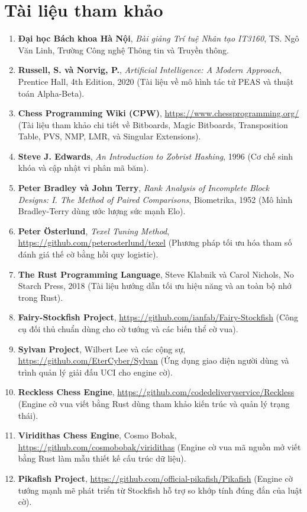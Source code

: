 \chapter*{Tài liệu tham khảo}

\begin{enumerate}
    \item \textbf{Đại học Bách khoa Hà Nội}, \textit{Bài giảng Trí tuệ Nhân tạo IT3160}, TS. Ngô Văn Linh, Trường Công nghệ Thông tin và Truyền thông.
    \item \textbf{Russell, S. và Norvig, P.}, \textit{Artificial Intelligence: A Modern Approach}, Prentice Hall, 4th Edition, 2020 (Tài liệu về mô hình tác tử PEAS và thuật toán Alpha-Beta).
    \item \textbf{Chess Programming Wiki (CPW)}, \url{https://www.chessprogramming.org/} (Tài liệu tham khảo chi tiết về Bitboards, Magic Bitboards, Transposition Table, PVS, NMP, LMR, và Singular Extensions).
    \item \textbf{Steve J. Edwards}, \textit{An Introduction to Zobrist Hashing}, 1996 (Cơ chế sinh khóa và cập nhật vi phân mã băm).
    \item \textbf{Peter Bradley và John Terry}, \textit{Rank Analysis of Incomplete Block Designs: I. The Method of Paired Comparisons}, Biometrika, 1952 (Mô hình Bradley-Terry dùng ước lượng sức mạnh Elo).
    \item \textbf{Peter Österlund}, \textit{Texel Tuning Method}, \url{https://github.com/peterosterlund/texel} (Phương pháp tối ưu hóa tham số đánh giá thế cờ bằng hồi quy logistic).
    \item \textbf{The Rust Programming Language}, Steve Klabnik và Carol Nichols, No Starch Press, 2018 (Tài liệu hướng dẫn tối ưu hiệu năng và an toàn bộ nhớ trong Rust).
    \item \textbf{Fairy-Stockfish Project}, \url{https://github.com/ianfab/Fairy-Stockfish} (Công cụ đối thủ chuẩn dùng cho cờ tướng và các biến thể cờ vua).
    \item \textbf{Sylvan Project}, Wilbert Lee và các cộng sự, \url{https://github.com/EterCyber/Sylvan} (Ứng dụng giao diện người dùng và trình quản lý giải đấu UCI cho engine cờ).
    \item \textbf{Reckless Chess Engine}, \url{https://github.com/codedeliveryservice/Reckless} (Engine cờ vua viết bằng Rust dùng tham khảo kiến trúc và quản lý trạng thái).
    \item \textbf{Viridithas Chess Engine}, Cosmo Bobak, \url{https://github.com/cosmobobak/viridithas} (Engine cờ vua mã nguồn mở viết bằng Rust làm mẫu thiết kế cấu trúc dữ liệu).
    \item \textbf{Pikafish Project}, \url{https://github.com/official-pikafish/Pikafish} (Engine cờ tướng mạnh mẽ phát triển từ Stockfish hỗ trợ so khớp tính đúng đắn của luật cờ).
\end{enumerate}

